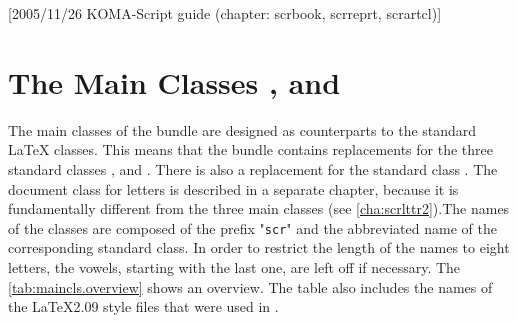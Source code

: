 %
%
%
%
%
%
%
%

[2005/11/26 KOMA-Script guide (chapter:
scrbook, scrreprt, scrartcl)]


\chapter{The Main Classes ,  and
  }

%

\begin{Explain}
  The main classes of the {\KOMAScript} bundle are designed as
  counterparts to the standard {\LaTeX} classes. This means that the
  {\KOMAScript} bundle contains replacements for the three standard
  classes ,
   and
  . There is also a replacement for
  the standard class . The
  document class for letters is described in a separate chapter,
  because it is fundamentally different from the three main classes
  (see \autoref{cha:scrlttr2}).The names of the {\KOMAScript}
  classes are composed of the prefix "\texttt{scr}" and the
  abbreviated name of the corresponding standard class. In order to
  restrict the length of the names to eight letters, the vowels,
  starting with the last one, are left off if necessary. The
  \autoref{tab:maincls.overview} shows an overview. The table also
  includes the names of the \LaTeX2.09 style files that were used in
  {\KOMAScript}.
\end{Explain}

